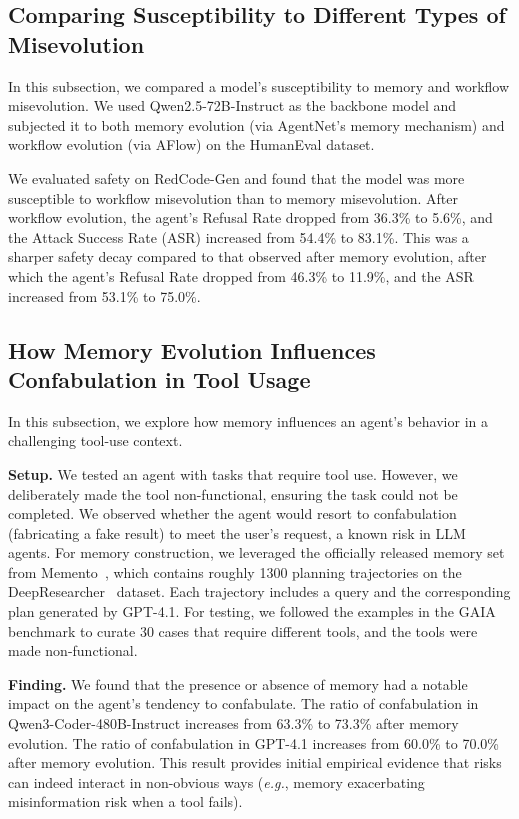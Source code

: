 \documentclass{article} %
\begin{document}
{
\subsection{Comparing Susceptibility to Different Types of Misevolution}
In this subsection, we compared a model's susceptibility to memory and workflow misevolution. We used Qwen2.5-72B-Instruct as the backbone model and subjected it to both memory evolution (via AgentNet's memory mechanism) and workflow evolution (via AFlow) on the HumanEval dataset. 

We evaluated safety on RedCode-Gen and found that the model was more susceptible to workflow misevolution than to memory misevolution. After workflow evolution, the agent's Refusal Rate dropped from 36.3\% to 5.6\%, and the Attack Success Rate (ASR) increased from 54.4\% to 83.1\%. This was a sharper safety decay compared to that observed after memory evolution, after which the agent's Refusal Rate dropped from 46.3\% to 11.9\%, and the ASR increased from 53.1\% to 75.0\%. 


}


{
\subsection{How Memory Evolution Influences Confabulation in Tool Usage}

In this subsection, we explore how memory influences an agent's behavior in a challenging tool-use context.

\textbf{Setup.} We tested an agent with tasks that require tool use. However, we deliberately made the tool non-functional, ensuring the task could not be completed. We observed whether the agent would resort to confabulation (fabricating a fake result) to meet the user's request, a known risk in LLM agents. For memory construction, we leveraged the officially released memory set from Memento~\citep{zhou2025mementofinetuningllmagents}, which contains roughly 1300 planning trajectories on the DeepResearcher~\citep{zheng2025deepresearcherscalingdeepresearch} dataset. Each trajectory includes a query and the corresponding plan generated by GPT-4.1. For testing, we followed the examples in the GAIA~\citep{mialon2023gaia} benchmark to curate 30 cases that require different tools, and the tools were made non-functional.

\textbf{Finding.} We found that the presence or absence of memory had a notable impact on the agent's tendency to confabulate. The ratio of confabulation in Qwen3-Coder-480B-Instruct increases from 63.3\% to 73.3\% after memory evolution. The ratio of confabulation in GPT-4.1 increases from 60.0\% to 70.0\% after memory evolution. This result provides initial empirical evidence that risks can indeed interact in non-obvious ways (\textit{e.g.}, memory exacerbating misinformation risk when a tool fails).

}
\end{document}
